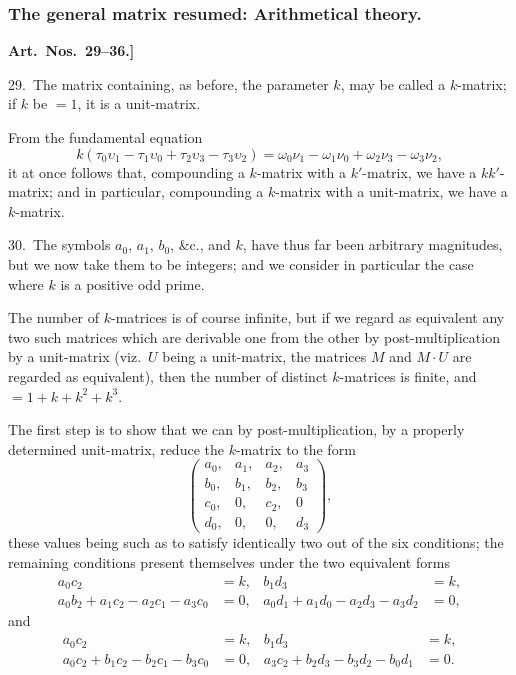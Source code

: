 \documentclass[11pt,a4paper]{article}
\theoremstyle{definition}
\begin{document}
\newpage

\subsubsection*{The general matrix resumed: Arithmetical theory.}

\textbf{Art.~Nos.~29--36.]
}

29.\ The matrix containing, as before, the parameter $k$, may be called a $k$-matrix; if $k$ be $= 1$, it is a unit-matrix.

From the fundamental equation
\[
k(\tau_0\upsilon_1 - \tau_1\upsilon_0 + \tau_2\upsilon_3 - \tau_3\upsilon_2) = \omega_0\nu_1 - \omega_1\nu_0 + \omega_2\nu_3 - \omega_3\nu_2,
\]
it at once follows that, compounding a $k$-matrix with a $k'$-matrix, we have a $kk'$-matrix; and in particular, compounding a $k$-matrix with a unit-matrix, we have a $k$-matrix.

\medskip

30.\ The symbols $a_0$, $a_1$, $b_0$, \&c., and $k$, have thus far been arbitrary magnitudes, but we now take them to be integers; and we consider in particular the case where $k$ is a positive odd prime.

The number of $k$-matrices is of course infinite, but if we regard as equivalent any two such matrices which are derivable one from the other by post-multiplication by a unit-matrix (viz.\ $U$ being a unit-matrix, the matrices $M$ and $M \cdot U$ are regarded as equivalent), then the number of distinct $k$-matrices is finite, and $= 1 + k + k^2 + k^3$.

The first step is to show that we can by post-multiplication, by a properly determined unit-matrix, reduce the $k$-matrix to the form
\[
\begin{pmatrix}
a_0, & a_1, & a_2, & a_3\\
b_0, & b_1, & b_2, & b_3\\
c_0, & 0, & c_2, & 0\\
d_0, & 0, & 0, & d_3
\end{pmatrix},
\]
these values being such as to satisfy identically two out of the six conditions; the remaining conditions present themselves under the two equivalent forms
\begin{align*}
a_0c_2 &= k, & b_1d_3 &= k,\\
a_0b_2 + a_1c_2 - a_2c_1 - a_3c_0 &= 0, & a_0d_1 + a_1d_0 - a_2d_3 - a_3d_2 &= 0,
\end{align*}
and
\begin{align*}
a_0c_2 &= k, & b_1d_3 &= k,\\
a_0c_2 + b_1c_2 - b_2c_1 - b_3c_0 &= 0, & a_3c_2 + b_2d_3 - b_3d_2 - b_0d_1 &= 0.
\end{align*}
\end{document}
